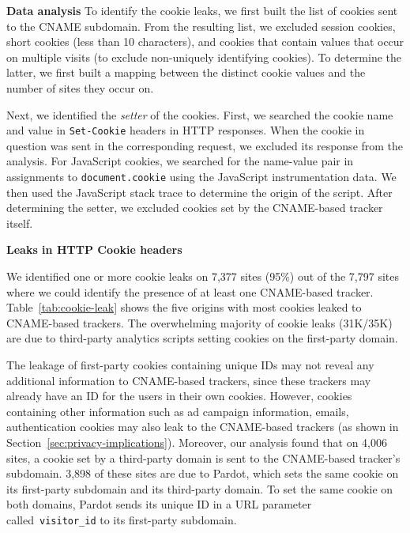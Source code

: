 \textbf{Data analysis}
To identify the cookie leaks, we first built the list of cookies sent to the CNAME subdomain.
From the resulting list, we excluded session cookies, short cookies (less than 10 characters), and cookies that contain values that occur on multiple visits (to exclude non-uniquely identifying cookies).
To determine the latter, we first built a mapping between the distinct cookie values and the number of sites they occur on.

Next, we identified the \emph{setter} of the cookies.
First, we searched the cookie name and value in \texttt{Set-Cookie} headers in HTTP responses.
When the cookie in question was sent in the corresponding request, we excluded its response from the analysis.
For JavaScript cookies, we searched for the name-value pair in assignments to \texttt{document.cookie} using the JavaScript instrumentation data.
We then used the JavaScript stack trace to determine the origin of the script.
After determining the setter, we excluded cookies set by the CNAME-based tracker itself.

\textbf{Leaks in HTTP Cookie headers}

We identified one or more cookie leaks on 7,377 sites (95\%) out of the 7,797 sites where we could identify the presence of at least one CNAME-based tracker.
Table~\ref{tab:cookie-leak} shows the five origins with most cookies leaked to CNAME-based trackers.
The overwhelming majority of cookie leaks (31K/35K) are due to third-party analytics scripts setting cookies on the first-party domain.


The leakage of first-party cookies containing unique IDs may not reveal any additional information to CNAME-based trackers, since these trackers may already have an ID for the users in their own cookies.
However, cookies containing other information such as ad campaign information, emails, authentication cookies may also leak to the CNAME-based trackers (as shown in Section~\ref{sec:privacy-implications}).
Moreover, our analysis found that on 4,006 sites, a cookie set by a third-party domain is sent to the CNAME-based tracker's subdomain.
3,898 of these sites are due to Pardot, which sets the same cookie on its first-party subdomain and its third-party domain.
To set the same cookie on both domains, Pardot sends its unique ID in a URL parameter called~\texttt{visitor\_id} to its first-party subdomain. 

